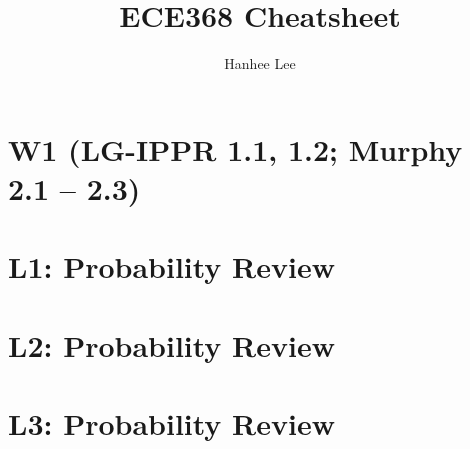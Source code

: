 \documentclass[twoside]{article}
\title{ECE368 Cheatsheet}
\author{Hanhee Lee}
\begin{document}
\maketitle

\tableofcontents

\begin{definition}
    
\end{definition}

\begin{process}

\end{process}

\begin{motivation}

\end{motivation}

\begin{derivation}

\end{derivation}

\begin{warning}

\end{warning}

\begin{summary}

\end{summary}

\begin{algo}

\end{algo}

\begin{example}
    
\end{example}

\begin{faq}

\end{faq}

\section*{W1 (LG-IPPR 1.1, 1.2; Murphy 2.1 – 2.3)}
\section{L1: Probability Review}

\newpage

\section{L2: Probability Review}

\newpage

\section{L3: Probability Review}

\cleardoublepage
\end{document}
